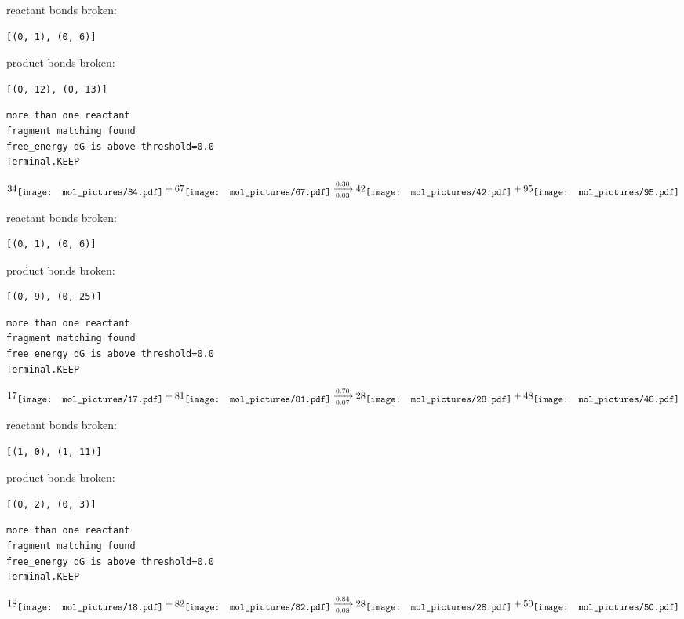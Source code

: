 \documentclass{article}
\begin{document}
reactant bonds broken:\begin{verbatim}
[(0, 1), (0, 6)]
\end{verbatim}
product bonds broken:\begin{verbatim}
[(0, 12), (0, 13)]
\end{verbatim}




\vspace{1cm}
\begin{verbatim}
more than one reactant
fragment matching found
free_energy dG is above threshold=0.0
Terminal.KEEP
\end{verbatim}
$$
34
\raisebox{-.5\height}{\texttt{[image: mol\_pictures/34.pdf]}}
+
67
\raisebox{-.5\height}{\texttt{[image: mol\_pictures/67.pdf]}}
\xrightarrow[0.03]{0.30}
42
\raisebox{-.5\height}{\texttt{[image: mol\_pictures/42.pdf]}}
+
95
\raisebox{-.5\height}{\texttt{[image: mol\_pictures/95.pdf]}}
$$


reactant bonds broken:\begin{verbatim}
[(0, 1), (0, 6)]
\end{verbatim}
product bonds broken:\begin{verbatim}
[(0, 9), (0, 25)]
\end{verbatim}




\vspace{1cm}
\begin{verbatim}
more than one reactant
fragment matching found
free_energy dG is above threshold=0.0
Terminal.KEEP
\end{verbatim}
$$
17
\raisebox{-.5\height}{\texttt{[image: mol\_pictures/17.pdf]}}
+
81
\raisebox{-.5\height}{\texttt{[image: mol\_pictures/81.pdf]}}
\xrightarrow[0.07]{0.70}
28
\raisebox{-.5\height}{\texttt{[image: mol\_pictures/28.pdf]}}
+
48
\raisebox{-.5\height}{\texttt{[image: mol\_pictures/48.pdf]}}
$$


reactant bonds broken:\begin{verbatim}
[(1, 0), (1, 11)]
\end{verbatim}
product bonds broken:\begin{verbatim}
[(0, 2), (0, 3)]
\end{verbatim}




\vspace{1cm}
\begin{verbatim}
more than one reactant
fragment matching found
free_energy dG is above threshold=0.0
Terminal.KEEP
\end{verbatim}
$$
18
\raisebox{-.5\height}{\texttt{[image: mol\_pictures/18.pdf]}}
+
82
\raisebox{-.5\height}{\texttt{[image: mol\_pictures/82.pdf]}}
\xrightarrow[0.08]{0.84}
28
\raisebox{-.5\height}{\texttt{[image: mol\_pictures/28.pdf]}}
+
50
\raisebox{-.5\height}{\texttt{[image: mol\_pictures/50.pdf]}}
$$
\end{document}
